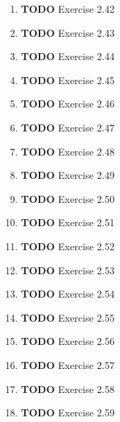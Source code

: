 \documentclass[11pt]{article}
\begin{document}
\begin{enumerate}
\begin{enumerate}
\item {\bfseries\sffamily TODO} Exercise 2.42
\label{sec:org53691fd}

\item {\bfseries\sffamily TODO} Exercise 2.43
\label{sec:org733c025}

\item {\bfseries\sffamily TODO} Exercise 2.44
\label{sec:orgc20373a}

\item {\bfseries\sffamily TODO} Exercise 2.45
\label{sec:org80720a8}

\item {\bfseries\sffamily TODO} Exercise 2.46
\label{sec:org6876ab9}

\item {\bfseries\sffamily TODO} Exercise 2.47
\label{sec:orgf17586a}

\item {\bfseries\sffamily TODO} Exercise 2.48
\label{sec:orge2d3c5d}

\item {\bfseries\sffamily TODO} Exercise 2.49
\label{sec:orge77e0bb}

\item {\bfseries\sffamily TODO} Exercise 2.50
\label{sec:org745356e}

\item {\bfseries\sffamily TODO} Exercise 2.51
\label{sec:org6fc4650}

\item {\bfseries\sffamily TODO} Exercise 2.52
\label{sec:org5410fbf}

\item {\bfseries\sffamily TODO} Exercise 2.53
\label{sec:orgb5ac4fd}

\item {\bfseries\sffamily TODO} Exercise 2.54
\label{sec:org938acc9}

\item {\bfseries\sffamily TODO} Exercise 2.55
\label{sec:orgb9f2e1d}

\item {\bfseries\sffamily TODO} Exercise 2.56
\label{sec:org3fa83a0}

\item {\bfseries\sffamily TODO} Exercise 2.57
\label{sec:orge8c31eb}

\item {\bfseries\sffamily TODO} Exercise 2.58
\label{sec:orgcf8a112}

\item {\bfseries\sffamily TODO} Exercise 2.59
\label{sec:org3cca758}


\end{enumerate}
\end{enumerate}
\end{document}
